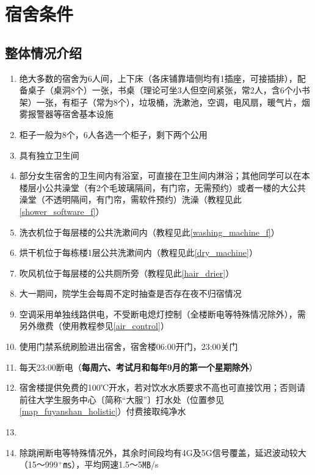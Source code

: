 \section[宿舍条件]{宿舍条件}

\subsection[整体情况介绍]{整体情况介绍}
\begin{enumerate}
    \item 绝大多数的宿舍为6人间，上下床\footnotemark（各床铺靠墙侧均有1插座，可接插排），配备桌子（桌洞8个）一张，书桌（理论可坐3人但空间紧张，常2人，含6个小书架）一张，有柜子（常为8个），垃圾桶，洗漱池，空调，电风扇，暖气片，烟雾报警器等宿舍基本设施
    \item 柜子\footnotemark 一般为8个，6人各选一个柜子，剩下两个公用
    \item 具有独立卫生间
    \item 部分女生宿舍的卫生间内有浴室，可直接在卫生间内淋浴；其他同学可以在本楼层小公共澡堂（有2个毛玻璃隔间，有门帘，无需预约）或者一楼的大公共澡堂（不透明隔间，有门帘，需软件预约）洗澡（教程见此\uline{\ref{shower_software_f}}）
    \item 洗衣机位于每层楼的公共洗漱间内（教程见此\uline{\ref{washing_machine_f}}）
    \item 烘干机位于每栋楼1层公共洗漱间内（教程见此\uline{\ref{dry_machine}}）
    \item 吹风机位于每层楼的公共厕所旁（教程见此\uline{\ref{hair_drier}}）
    \item 大一期间，院学生会每周不定时抽查是否存在夜不归宿情况
    \item 空调采用单独线路供电，不受断电熄灯控制（全楼断电等特殊情况除外），需另外缴费（使用教程参见\uline{\ref{air_control}}）
    \item 使用门禁系统刷脸进出宿舍，宿舍楼06:00开门，23:00关门
    \item 每天23:00断电（\textbf{每周六、考试月和每年9月的第一个星期除外}）
    \item 宿舍楼提供免费的100℃开水\footnotemark，若对饮水水质要求不高也可直接饮用；否则请前往大学生服务中心〔简称“大服”〕打水处（位置参见\uline{\ref{map_fuyanshan_holistic}}）付费接取纯净水
    \item \textbf{}
    \item 除跳闸断电等特殊情况外，其余时间段均有4G及5G信号覆盖，延迟波动较大（15～999$^+$㎳），平均网速1.5～5㎆/s
\end{enumerate}

